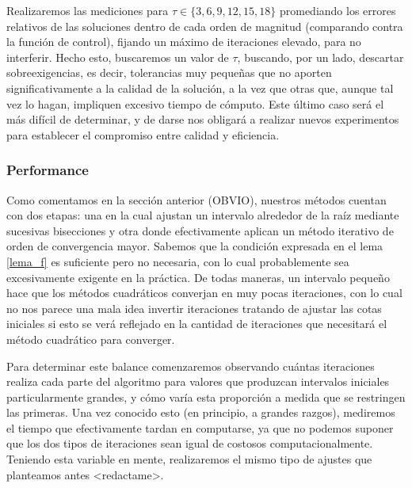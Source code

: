 Realizaremos las mediciones para $\tau \in \{3,6,9,12,15, 18\}$ promediando los errores relativos de las soluciones dentro de cada orden de magnitud (comparando contra la función de control), fijando un máximo de iteraciones elevado, para no interferir. Hecho esto, buscaremos un valor de $\tau$, buscando, por un lado, descartar sobreexigencias, es decir, tolerancias muy pequeñas que no aporten significativamente a la calidad de la solución, a la vez que otras que, aunque tal vez lo hagan, impliquen excesivo tiempo de cómputo. Este último caso será el más difícil de determinar, y de darse nos 
obligará a realizar nuevos experimentos para establecer el compromiso entre calidad y eficiencia.

	\subsubsection{Performance}
Como comentamos en la sección anterior (OBVIO), nuestros métodos cuentan con dos etapas: una en la cual ajustan un intervalo alrededor de la raíz mediante sucesivas bisecciones y otra donde efectivamente aplican un método iterativo de orden de convergencia mayor. Sabemos que la condición expresada en el lema \ref{lema_f} es suficiente pero no necesaria, con lo cual probablemente sea excesivamente exigente en la práctica. De todas maneras, un intervalo pequeño hace que los métodos cuadráticos converjan en muy pocas iteraciones, con lo cual no nos parece una mala idea invertir iteraciones tratando de ajustar las cotas iniciales si esto se verá reflejado en la cantidad de iteraciones que necesitará el método cuadrático para converger.

Para determinar este balance comenzaremos observando cuántas iteraciones realiza cada parte del algoritmo para valores que produzcan intervalos iniciales particularmente grandes, y cómo varía esta proporción a medida que se restringen las primeras. Una vez conocido esto (en principio, a grandes razgos), mediremos el tiempo que efectivamente tardan en computarse, ya que no podemos suponer que los dos tipos de iteraciones sean igual de costosos computacionalmente. Teniendo esta variable en mente, realizaremos el mismo tipo de ajustes que planteamos antes <redactame>.

